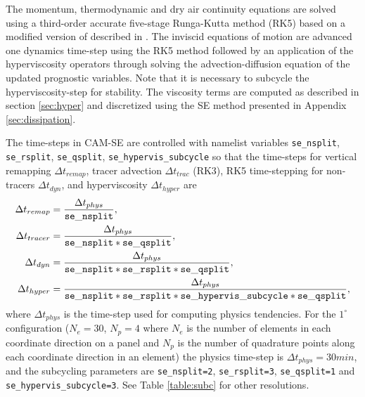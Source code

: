 \documentclass{agujournal}
\begin{document}
{The momentum, thermodynamic and dry air continuity equations are solved using a third-order accurate five-stage Runga-Kutta method (RK5) based on a modified version of \cite{KG1984MCSb,KG1984MCS} described in \cite{GU2016GMD}. The inviscid equations of motion are advanced one dynamics time-step using the RK5 method followed by an application of the hyperviscosity operators through solving the advection-diffusion equation of the updated prognostic variables. Note that it is necessary to subcycle the hyperviscosity-step for stability. The viscosity terms are computed as described in section \ref{sec:hyper} and discretized using the SE method presented in Appendix \ref{sec:dissipation}.


The time-steps in CAM-SE are controlled with namelist variables {\tt{se\_nsplit}}, {\tt{se\_rsplit}}, {\tt{se\_qsplit}},
{\tt{se\_hypervis\_subcycle}}  so that the time-steps for vertical remapping $\Delta t_{remap}$, tracer advection $\Delta t_{trac}$ (RK3), RK5 time-stepping for non-tracers $\Delta t_{dyn}$, and hyperviscosity $\Delta t_{hyper}$ are
\begin{align}
\Delta t_{remap}&=\frac{\Delta t_{phys}}{\tt{se\_nsplit}},\\
\Delta t_{tracer}&=\frac{\Delta t_{phys}}{\tt{se\_nsplit}*\tt{se\_qsplit}},\\
\Delta t_{dyn}&=\frac{\Delta t_{phys}}{\tt{se\_nsplit*se\_rsplit}*\tt{se\_qsplit}},\\
\Delta t_{hyper}&=\frac{\Delta t_{phys}}{\tt{se\_nsplit*se\_rsplit*se\_hypervis\_subcycle}*\tt{se\_qsplit}},
\end{align}
where $\Delta t_{phys}$ is the time-step used for computing physics tendencies. For the $1^\circ$ configuration ($N_e=30$, $N_p=4$ where $N_e$ is the number of elements in each coordinate direction on a panel and $N_p$ is the number of quadrature points along each coordinate direction in an element) the physics time-step is $\Delta t_{phys}=30 min$, and the subcycling parameters are {\tt{se\_nsplit}=2}, {\tt{se\_rsplit=3}}, {\tt{se\_qsplit=1}} and {\tt{se\_hypervis\_subcycle=3}}. See Table \ref{table:subc} for other resolutions.

}
\end{document}

